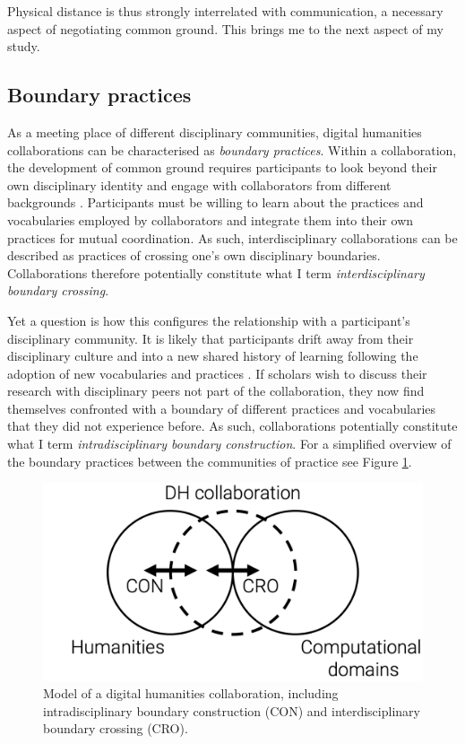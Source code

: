 \documentclass{article}
\begin{document}
Physical distance is thus strongly interrelated with communication, a necessary aspect of negotiating common ground. 
This brings me to the next aspect of my study.

\subsection{Boundary practices}\label{sec:boundary-practices}
As a meeting place of different disciplinary communities, digital humanities collaborations can be characterised as \textit{boundary practices}.
Within a collaboration, the development of common ground requires participants to look beyond their own disciplinary identity and engage with collaborators from different backgrounds \citep{Siemens2011a}. 
Participants must be willing to learn about the practices and vocabularies employed by collaborators and integrate them into their own practices for mutual coordination.
As such, interdisciplinary collaborations can be described as practices of crossing one's own disciplinary boundaries.
Collaborations therefore potentially constitute what I term \textit{interdisciplinary boundary crossing}.

Yet a question is how this configures the relationship with a participant's disciplinary community.
It is likely that participants drift away from their disciplinary culture and into a new shared history of learning following the adoption of new vocabularies and practices \citep[p. 103]{wenger1998}.
If scholars wish to discuss their research with disciplinary peers not part of the collaboration, they now find themselves confronted with a boundary of different practices and vocabularies that they did not experience before.
As such, collaborations potentially constitute what I term \textit{intradisciplinary boundary construction}.
For a simplified overview of the boundary practices between the communities of practice see Figure \ref{fig:collabmodel}.

\begin{figure}
\begin{center} 
\includegraphics[width=0.7\linewidth]{collabmodelv2.png}  
\caption{Model of a digital humanities collaboration, including intradisciplinary boundary construction (CON) and interdisciplinary boundary crossing (CRO).\label{fig:collabmodel}}  
\end{center}  
\end{figure}
\end{document}
